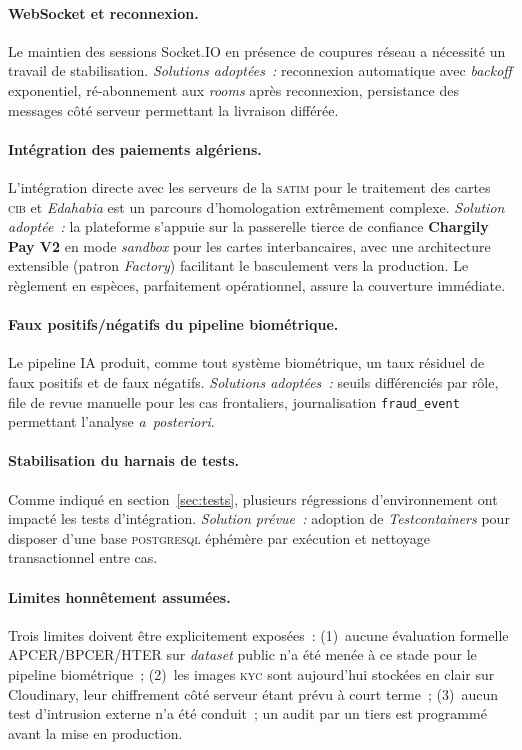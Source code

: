 \documentclass[12pt, a4paper, oneside]{report}
\begin{document}
\paragraph{WebSocket et reconnexion.} Le maintien des sessions Socket.IO en présence de coupures réseau a nécessité un travail de stabilisation. \textit{Solutions adoptées~:} reconnexion automatique avec \textit{backoff} exponentiel, ré-abonnement aux \textit{rooms} après reconnexion, persistance des messages côté serveur permettant la livraison différée.

\paragraph{Intégration des paiements algériens.} L'intégration directe avec les serveurs de la \textsc{satim} pour le traitement des cartes \textsc{cib} et \textit{Edahabia} est un parcours d'homologation extrêmement complexe. \textit{Solution adoptée~:} la plateforme s'appuie sur la passerelle tierce de confiance \textbf{Chargily Pay V2} en mode \textit{sandbox} pour les cartes interbancaires, avec une architecture extensible (patron \textit{Factory}) facilitant le basculement vers la production. Le règlement en espèces, parfaitement opérationnel, assure la couverture immédiate.

\paragraph{Faux positifs/négatifs du pipeline biométrique.} Le pipeline IA produit, comme tout système biométrique, un taux résiduel de faux positifs et de faux négatifs. \textit{Solutions adoptées~:} seuils différenciés par rôle, file de revue manuelle pour les cas frontaliers, journalisation \texttt{fraud\_event} permettant l'analyse \textit{a~posteriori}.

\paragraph{Stabilisation du harnais de tests.} Comme indiqué en section~\ref{sec:tests}, plusieurs régressions d'environnement ont impacté les tests d'intégration. \textit{Solution prévue~:} adoption de \textit{Testcontainers} pour disposer d'une base \textsc{postgresql} éphémère par exécution et nettoyage transactionnel entre cas.

\paragraph{Limites honnêtement assumées.} Trois limites doivent être explicitement exposées~: (1)~aucune évaluation formelle APCER/BPCER/HTER sur \textit{dataset} public n'a été menée à ce stade pour le pipeline biométrique~; (2)~les images \textsc{kyc} sont aujourd'hui stockées en clair sur Cloudinary, leur chiffrement côté serveur étant prévu à court terme~; (3)~aucun test d'intrusion externe n'a été conduit~; un audit par un tiers est programmé avant la mise en production.
\end{document}
